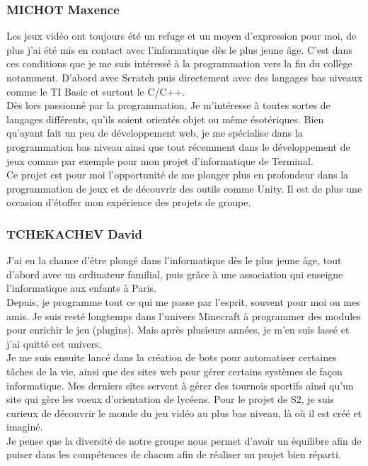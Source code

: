 \documentclass{article}
\begin{document}
\subsubsection{MICHOT Maxence}

Les jeux vidéo ont toujours été un refuge et un moyen d'expression pour moi, de plus j'ai été mis en contact avec l'informatique dès le plus jeune âge. C'est dans ces conditions que je me suis intéressé à la programmation vers la fin du collège notamment. D'abord avec Scratch puis directement avec des langages bas niveaux comme le TI Basic et surtout le C/C++. \\
Dès lors passionné par la programmation, Je m'intéresse à toutes sortes de langages différents, qu'ils soient orientés objet ou même ésotériques. Bien qu'ayant fait un peu de développement web, je me spécialise dans la programmation bas niveau ainsi que tout récemment dans le développement de jeux comme par exemple pour mon projet d'informatique de Terminal. \\
Ce projet est pour moi l'opportunité de me plonger plus en profondeur dans la programmation de jeux et de découvrir des outils comme Unity. Il est de plus une occasion d'étoffer mon expérience des projets de groupe.

\subsubsection{TCHEKACHEV David}

J'ai eu la chance d'être plongé dans l'informatique dès le plus jeune âge, tout d'abord avec un ordinateur familial, puis grâce à une association qui enseigne l'informatique aux enfants à Paris. \\
Depuis, je programme tout ce qui me passe par l'esprit, souvent pour moi ou mes amis. Je suis resté longtemps dans l'univers Minecraft à programmer des modules pour enrichir le jeu (plugins). Mais après plusieurs années, je m'en suis lassé et j'ai quitté cet univers. \\
Je me suis ensuite lancé dans la création de bots pour automatiser certaines tâches de la vie, ainsi que des sites web pour gérer certains systèmes de façon informatique. Mes derniers sites servent à gérer des tournois sportifs ainsi qu'un site qui gère les voeux d'orientation de lycéens.
Pour le projet de S2, je suis curieux de découvrir le monde du jeu vidéo au plus bas niveau, là où il est créé et imaginé.  \\
Je pense que la diversité de notre groupe nous permet d'avoir un équilibre afin de puiser dans les compétences de chacun afin de réaliser un projet bien réparti.
\end{document}

